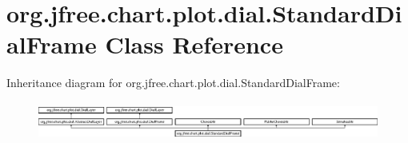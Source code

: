 \hypertarget{classorg_1_1jfree_1_1chart_1_1plot_1_1dial_1_1_standard_dial_frame}{}\section{org.\+jfree.\+chart.\+plot.\+dial.\+Standard\+Dial\+Frame Class Reference}
\label{classorg_1_1jfree_1_1chart_1_1plot_1_1dial_1_1_standard_dial_frame}
Inheritance diagram for org.\+jfree.\+chart.\+plot.\+dial.\+Standard\+Dial\+Frame\+:\begin{figure}[H]
\begin{center}
\leavevmode
\includegraphics[height=1.277567cm]{classorg_1_1jfree_1_1chart_1_1plot_1_1dial_1_1_standard_dial_frame}
\end{center}
\end{figure}
